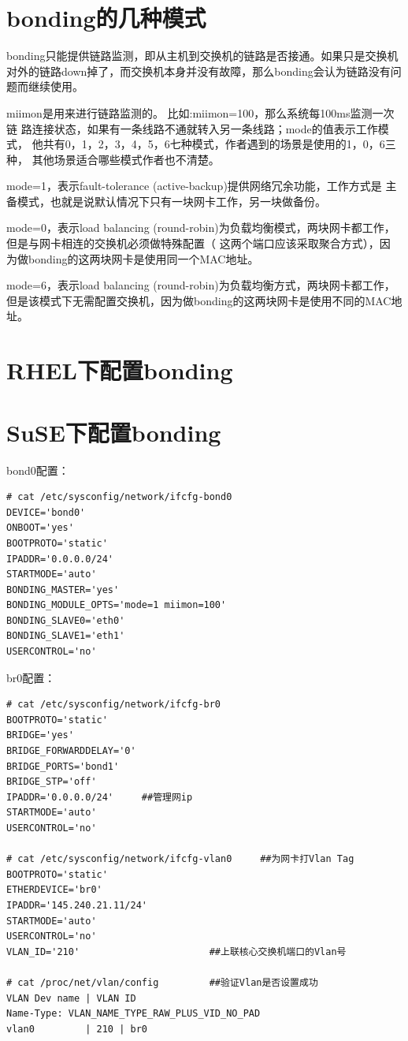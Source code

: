 \section{bonding的几种模式}

bonding只能提供链路监测，即从主机到交换机的链路是否接通。如果只是交换机
对外的链路down掉了，而交换机本身并没有故障，那么bonding会认为链路没有问
题而继续使用。
 
miimon是用来进行链路监测的。 比如:miimon=100，那么系统每100ms监测一次链
路连接状态，如果有一条线路不通就转入另一条线路；mode的值表示工作模式，
他共有0，1，2，3，4，5，6七种模式，作者遇到的场景是使用的1，0，6三种，
其他场景适合哪些模式作者也不清楚。
 
mode=1，表示fault-tolerance (active-backup)提供网络冗余功能，工作方式是
主备模式，也就是说默认情况下只有一块网卡工作，另一块做备份。
 
mode=0，表示load balancing (round-robin)为负载均衡模式，两块网卡都工作，
但是与网卡相连的交换机必须做特殊配置（ 这两个端口应该采取聚合方式），因
为做bonding的这两块网卡是使用同一个MAC地址。
 
mode=6，表示load balancing (round-robin)为负载均衡方式，两块网卡都工作，
但是该模式下无需配置交换机，因为做bonding的这两块网卡是使用不同的MAC地
址。
 
\section{RHEL下配置bonding}

\section{SuSE下配置bonding}

bond0配置：

\small{
\begin{verbatim}
# cat /etc/sysconfig/network/ifcfg-bond0
DEVICE='bond0'
ONBOOT='yes'
BOOTPROTO='static'
IPADDR='0.0.0.0/24'   
STARTMODE='auto'
BONDING_MASTER='yes'
BONDING_MODULE_OPTS='mode=1 miimon=100'
BONDING_SLAVE0='eth0'
BONDING_SLAVE1='eth1'
USERCONTROL='no'
\end{verbatim}
}
\normalsize

br0配置：

\small{
\begin{verbatim}
# cat /etc/sysconfig/network/ifcfg-br0
BOOTPROTO='static'
BRIDGE='yes'
BRIDGE_FORWARDDELAY='0'
BRIDGE_PORTS='bond1'
BRIDGE_STP='off'
IPADDR='0.0.0.0/24'    	##管理网ip
STARTMODE='auto'
USERCONTROL='no'

# cat /etc/sysconfig/network/ifcfg-vlan0     ##为网卡打Vlan Tag
BOOTPROTO='static'
ETHERDEVICE='br0'
IPADDR='145.240.21.11/24'
STARTMODE='auto'
USERCONTROL='no'
VLAN_ID='210'                       ##上联核心交换机端口的Vlan号

# cat /proc/net/vlan/config         ##验证Vlan是否设置成功
VLAN Dev name | VLAN ID
Name-Type: VLAN_NAME_TYPE_RAW_PLUS_VID_NO_PAD
vlan0         | 210 | br0
\end{verbatim}
}
\normalsize

